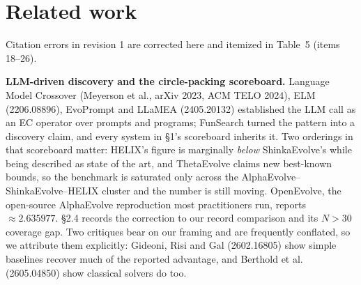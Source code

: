 \documentclass[11pt]{article}
\begin{document}
\section{Related work}

Citation errors in revision 1 are corrected here and itemized in Table~5 (items 18--26).

\textbf{LLM-driven discovery and the circle-packing scoreboard.} Language Model Crossover (Meyerson
et al., arXiv 2023, ACM TELO 2024), ELM (2206.08896), EvoPrompt and LLaMEA (2405.20132)
established the LLM call as an EC operator over prompts and programs; FunSearch turned the
pattern into a discovery claim, and every system in \S1's scoreboard inherits it. Two orderings
in that scoreboard matter: HELIX's figure is marginally \textit{below} ShinkaEvolve's while being
described as state of the art, and ThetaEvolve claims new best-known bounds, so the benchmark is
saturated only across the AlphaEvolve--ShinkaEvolve--HELIX cluster and the number is still moving.
OpenEvolve, the open-source AlphaEvolve reproduction most practitioners run, reports ${\approx}2.635977$.
\S2.4 records the correction to our record comparison and its $N > 30$ coverage gap. Two critiques
bear on our framing and are frequently conflated, so we attribute them explicitly: Gideoni, Risi
and Gal (2602.16805) show simple baselines recover much of the reported advantage, and Berthold
et al. (2605.04850) show classical solvers do too.
\end{document}
